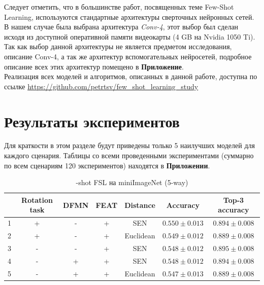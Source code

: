 \documentclass[a4paper, 12pt]{report}
\begin{document}
Следует отметить, что в большинстве работ, посвященных теме Few-Shot Learning, используются стандартные архитектуры сверточных нейронных сетей. В нашем случае была выбрана архитектура \textit{Conv-4}, этот выбор был сделан исходя из доступной оперативной памяти видеокарты (4 GB на Nvidia 1050 Ti). Так как выбор данной архитектуры не является предметом исследования, описание Conv-4, а так же архитектур вспомогательных нейросетей, подробное описание всех этих архитектур помещено в \textbf{Приложение}. \\

Реализация всех моделей и алгоритмов, описанных в данной работе, доступна по ссылке \url{https://github.com/petrtsv/few_shot_learning_study}

\chapter{Результаты экспериментов}

Для краткости в этом разделе будут приведены только 5 наилучших моделей для каждого сценария. Таблицы со всеми проведенными экспериментами (суммарно по всем сценариям 120 экспериментов) находятся в  \textbf{Приложении}.

\begin{table}[H]
\begin{adjustbox}{center}
\begin{tabular}{| r | c c c c | c |  c | }
\hline
    & Rotation task   & DFMN   & FEAT   & Distance         & Accuracy         & Top-3 accuracy   \\
\hline
  1 & +               & -      & +      & SEN              & $0.550 \pm 0.013$ & $0.894 \pm 0.008$ \\
\hline
  2 & +               & -      & +      & Euclidean        & $0.549 \pm 0.012$ & $0.889 \pm 0.008$ \\
\hline
  3 & -               & -      & +      & SEN              & $0.548 \pm 0.012$ & $0.895 \pm 0.008$ \\
\hline
  4 & -               & +      & +      & SEN              & $0.548 \pm 0.012$ & $0.894 \pm 0.008$ \\
\hline
  5 & -               & +      & +      & Euclidean        & $0.547 \pm 0.013$ & $0.889 \pm 0.008$ \\
\hline
\end{tabular}
\end{adjustbox}
	\caption{-shot FSL на miniImageNet (5-way)}
\end{table}
\end{document}
